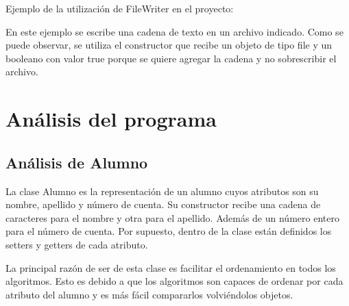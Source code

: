 \documentclass[11pt]{article}
\begin{document}
Ejemplo de la utilización de FileWriter en el proyecto:

En este ejemplo se escribe una cadena de texto en un archivo indicado. Como se puede observar, se utiliza el constructor que recibe un objeto de tipo file y un booleano con valor true porque se quiere agregar la cadena y no sobrescribir el archivo.


\section{Análisis del programa}
\subsection{Análisis de Alumno}
La clase Alumno es la representación de un alumno cuyos atributos son su nombre, apellido y número de cuenta. Su constructor recibe una cadena de caracteres para el nombre y otra para el apellido. Además de un número entero para el número de cuenta. Por supuesto, dentro de la clase están definidos los setters y getters de cada atributo.
\par
La principal razón de ser de esta clase es facilitar el ordenamiento en todos los algoritmos. Esto es debido a que los algoritmos son capaces de ordenar por cada atributo del alumno y es más fácil compararlos volviéndolos objetos.
\end{document}
